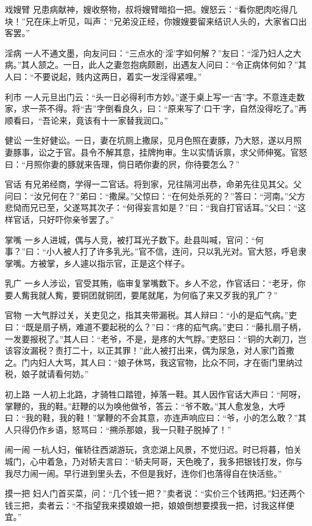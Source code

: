 \documentclass[12pt,UTF8]{ctexbook}
\begin{document}
戏嫂臂
兄患病献神，嫂收祭物，叔将嫂臂暗掐一把。嫂怒云：“看你肥肉吃得几块！”兄在床上听见，叫声：“兄弟没正经，你嫂嫂要留来结识人头的，大家省口出客罢。”

淫病
一人不通文墨，向友问曰：“三点水的‘淫’字如何解？”友曰：“淫乃妇人之大病。”其人颔之。一日，此人之妻忽抱病颇剧，出遇友人问曰：“令正病体何如？”其人曰：“不要说起，贱内这两日，着实一发淫得紧哩。”

利市
一人元旦出门云：“头一日必得利市方妙。”遂于桌上写一“吉”字。不意连走数家，求一茶不得。将“吉”字倒看良久，曰：“原来写了‘口干’字，自然没得吃了。”再顺看曰，“吾论来，竟该有十一家替我润口。”

健讼
一生好健讼。一日，妻在坑厕上撒尿，见月色照在妻豚，乃大怒，遂以月照妻豚事，讼之于官。县令不解其意，挂牌拘审。生以实情诉禀，求父师伸冤。官怒曰：“月照你妻的豚就来告理，倘日晒你妻的屄，你待要怎么？”

官话
有兄弟经商，学得一二官话。将到家，兄往隔河出恭，命弟先往见其父。父问曰：“汝兄何在？”弟曰：“撒屎。”父惊曰：“在何处杀死的？”答曰：“河南。”父方悲恸而兄已至，父遂骂其次子：“何得妄言如是？”曰：“我自打官话耳。”父曰：“这样官话，只好吓你亲爷罢了。”

掌嘴
一乡人进城，偶与人竞，被打耳光子数下。赴县叫喊，官问：“何事？”曰：“小人被人打了许多乳光。”官不信，连问，只以乳光对。官大怒，呼皂隶掌嘴。方被掌，乡人遽以指示官，正是这个样子。

乳广
一乡人涉讼，官受其贿，临审复掌嘴数下。乡人不忿，作官话曰：“老牙，你要人觜我就人觜，要铜团就铜团，要尾就尾，为何临了来又歹我的乳广？”

官物
一大气脬过关，关吏见之，指其夹带漏税。其人辩曰：“小的是疝气病。”吏曰：“既是扇子柄，难道不要起税的么？”曰：“疼的疝气病。”吏曰：“藤扎扇子柄，一发要报税了。”其人曰：“老爷，不是，是疼的大气脬。”吏怒曰：“铜的大剃刀，岂该容汝漏税？责打二十，以正其罪！”此人被打出来，偶为尿急，对人家门首撒之。门内妇人大骂，其人曰：“娘子休骂，我这官物，比众不同，才在衙门里纳过税，娘子就请看何妨。”

初上路
一人初上北路，才骑牲口踏镫，掉落一鞋。其人因作官话大声曰：“阿呀，掌鞭的，我的鞋。”赶鞭的以为唤他做爷，答云：“爷不敢。”其人愈发急，大呼曰：“我的鞋，我的鞋！”掌鞭的不会其意，亦连声响应曰：“爷，小的怎么敢？”其人只得仍作乡语，怒骂曰：“搠杀那娘，我一只鞋子脱掉了！”

闹一闹
一杭人妇，催轿往西湖游玩，贪恋湖上风景，不觉归迟。时已将暮，怕关城门，心中着急，乃对轿夫言曰：“轿夫阿哥，天色晚了，我多把银钱打发，你与我尽力闹一闹。早行进到里头去，不但是我好，连你们也落得自在快活些。”

摸一把
妇人门首买菜，问：“几个钱一把？”卖者说：“实价三个钱两把。”妇还两个钱三把，卖者云：“不指望我来摸娘娘一把，娘娘倒想要摸我一把，讨我这样便宜。”
\end{document}
